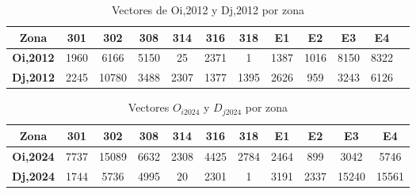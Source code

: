 \documentclass[letterpaper,12pt]{article}
\begin{document}
\begin{table}[h!]
    \centering
    \begin{tabular}{c|ccccccccccc}
    \textbf{Zona} & \textbf{301} & \textbf{302} & \textbf{308} & \textbf{314} & \textbf{316} & \textbf{318} & \textbf{E1} & \textbf{E2} & \textbf{E3} & \textbf{E4} \\ \hline
    \textbf{Oi,2012} & 1960 & 6166 & 5150 & 25 & 2371 & 1 & 1387 & 1016 & 8150 & 8322 \\ 
    \textbf{Dj,2012} & 2245 & 10780 & 3488 & 2307 & 1377 & 1395 & 2626 & 959 & 3243 & 6126 \\
    \end{tabular}
    \caption{Vectores de Oi,2012 y Dj,2012 por zona}
    \label{table:oi_dj_2012}
    \end{table}


\begin{table}[h!]
    \centering
    \begin{tabular}{c|cccccccccc}
    \textbf{Zona} & \textbf{301} & \textbf{302} & \textbf{308} & \textbf{314} & \textbf{316} & \textbf{318} & \textbf{E1} & \textbf{E2} & \textbf{E3} & \textbf{E4} \\ \hline
    \textbf{Oi,2024} & 7737 & 15089 & 6632 & 2308 & 4425 & 2784 & 2464 & 899 & 3042 & 5746 \\ 
    \textbf{Dj,2024} & 1744 & 5736 & 4995 & 20 & 2301 & 1 & 3191 & 2337 & 15240 & 15561 \\ 
    \end{tabular}
    \caption{Vectores $O_{i2024}$ y $D_{j2024}$ por zona}
    \label{table:oi_dj_2024}
\end{table}
\end{document}
